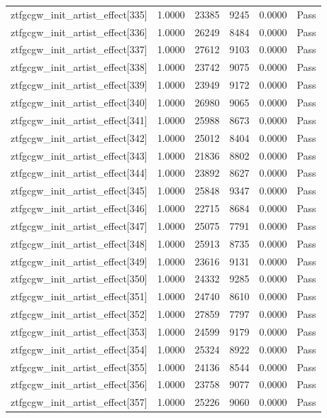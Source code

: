 \begin{table}[htbp]
\begin{tabular}{llrrll}
ztfgcgw\_init\_artist\_effect[335] & 1.0000 & 23385 & 9245 & 0.0000 & Pass \\
ztfgcgw\_init\_artist\_effect[336] & 1.0000 & 26249 & 8484 & 0.0000 & Pass \\
ztfgcgw\_init\_artist\_effect[337] & 1.0000 & 27612 & 9103 & 0.0000 & Pass \\
ztfgcgw\_init\_artist\_effect[338] & 1.0000 & 23742 & 9075 & 0.0000 & Pass \\
ztfgcgw\_init\_artist\_effect[339] & 1.0000 & 23949 & 9172 & 0.0000 & Pass \\
ztfgcgw\_init\_artist\_effect[340] & 1.0000 & 26980 & 9065 & 0.0000 & Pass \\
ztfgcgw\_init\_artist\_effect[341] & 1.0000 & 25988 & 8673 & 0.0000 & Pass \\
ztfgcgw\_init\_artist\_effect[342] & 1.0000 & 25012 & 8404 & 0.0000 & Pass \\
ztfgcgw\_init\_artist\_effect[343] & 1.0000 & 21836 & 8802 & 0.0000 & Pass \\
ztfgcgw\_init\_artist\_effect[344] & 1.0000 & 23892 & 8627 & 0.0000 & Pass \\
ztfgcgw\_init\_artist\_effect[345] & 1.0000 & 25848 & 9347 & 0.0000 & Pass \\
ztfgcgw\_init\_artist\_effect[346] & 1.0000 & 22715 & 8684 & 0.0000 & Pass \\
ztfgcgw\_init\_artist\_effect[347] & 1.0000 & 25075 & 7791 & 0.0000 & Pass \\
ztfgcgw\_init\_artist\_effect[348] & 1.0000 & 25913 & 8735 & 0.0000 & Pass \\
ztfgcgw\_init\_artist\_effect[349] & 1.0000 & 23616 & 9131 & 0.0000 & Pass \\
ztfgcgw\_init\_artist\_effect[350] & 1.0000 & 24332 & 9285 & 0.0000 & Pass \\
ztfgcgw\_init\_artist\_effect[351] & 1.0000 & 24740 & 8610 & 0.0000 & Pass \\
ztfgcgw\_init\_artist\_effect[352] & 1.0000 & 27859 & 7797 & 0.0000 & Pass \\
ztfgcgw\_init\_artist\_effect[353] & 1.0000 & 24599 & 9179 & 0.0000 & Pass \\
ztfgcgw\_init\_artist\_effect[354] & 1.0000 & 25324 & 8922 & 0.0000 & Pass \\
ztfgcgw\_init\_artist\_effect[355] & 1.0000 & 24136 & 8544 & 0.0000 & Pass \\
ztfgcgw\_init\_artist\_effect[356] & 1.0000 & 23758 & 9077 & 0.0000 & Pass \\
ztfgcgw\_init\_artist\_effect[357] & 1.0000 & 25226 & 9060 & 0.0000 & Pass \\

\end{tabular}
\end{table}
